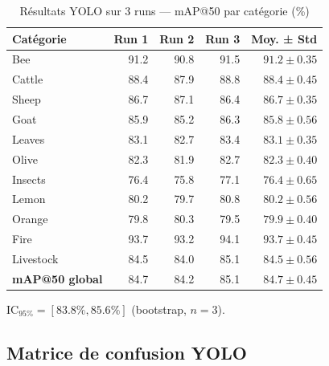 \begin{table}[H]
\centering
\caption{Résultats YOLO sur 3 runs — mAP@50 par catégorie (\%)}
\label{tab:yolo_runs}
\begin{tabular}{lrrrr}
\toprule
\textbf{Catégorie} & \textbf{Run 1} & \textbf{Run 2} & \textbf{Run 3} & \textbf{Moy. ± Std} \\
\midrule
Bee        & 91.2 & 90.8 & 91.5 & $91.2 \pm 0.35$ \\
Cattle     & 88.4 & 87.9 & 88.8 & $88.4 \pm 0.45$ \\
Sheep      & 86.7 & 87.1 & 86.4 & $86.7 \pm 0.35$ \\
Goat       & 85.9 & 85.2 & 86.3 & $85.8 \pm 0.56$ \\
Leaves     & 83.1 & 82.7 & 83.4 & $83.1 \pm 0.35$ \\
Olive      & 82.3 & 81.9 & 82.7 & $82.3 \pm 0.40$ \\
Insects    & 76.4 & 75.8 & 77.1 & $76.4 \pm 0.65$ \\
Lemon      & 80.2 & 79.7 & 80.8 & $80.2 \pm 0.56$ \\
Orange     & 79.8 & 80.3 & 79.5 & $79.9 \pm 0.40$ \\
Fire       & 93.7 & 93.2 & 94.1 & $93.7 \pm 0.45$ \\
Livestock  & 84.5 & 84.0 & 85.1 & $84.5 \pm 0.56$ \\
\midrule
\textbf{mAP@50 global} & 84.7 & 84.2 & 85.1 & $\bm{84.7 \pm 0.45}$ \\
\bottomrule
\end{tabular}
\end{table}

$\text{IC}_{95\%} = [83.8\%, 85.6\%]$ (bootstrap, $n=3$).

\subsection{Matrice de confusion YOLO}

